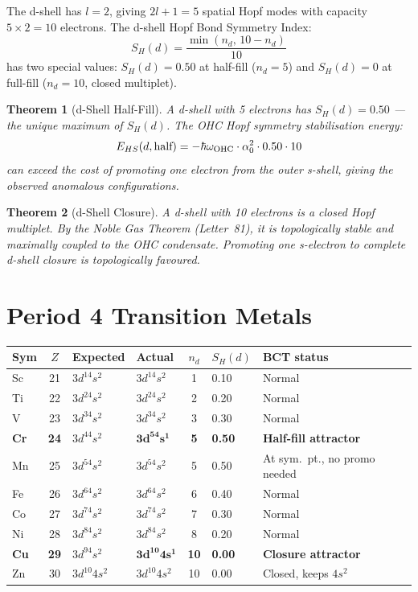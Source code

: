 \documentclass[aps,prl,twocolumn,showpacs,superscriptaddress]{revtex4-2}
\newtheorem{theorem}{Theorem}
\begin{document}
The d-shell has $l=2$, giving $2l+1=5$ spatial Hopf modes with 
capacity $5\times2=10$ electrons. The d-shell Hopf Bond Symmetry 
Index:
\begin{equation}
    S_H(d) = \frac{\min(n_d,\,10-n_d)}{10}
\end{equation}
has two special values: $S_H(d)=0.50$ at half-fill ($n_d=5$) and 
$S_H(d)=0$ at full-fill ($n_d=10$, closed multiplet).

\begin{theorem}[d-Shell Half-Fill]
A d-shell with 5 electrons has $S_H(d)=0.50$ --- the unique 
maximum of $S_H(d)$. The OHC Hopf symmetry stabilisation energy:
\begin{equation}
    E_{HS}(d,\text{half}) = -\hbar\omega_{\rm OHC}\cdot\alpha_0^2
    \cdot 0.50 \cdot 10
\end{equation}
can exceed the cost of promoting one electron from the outer 
s-shell, giving the observed anomalous configurations.
\end{theorem}

\begin{theorem}[d-Shell Closure]
A d-shell with 10 electrons is a closed Hopf multiplet. By the 
Noble Gas Theorem (Letter~81), it is topologically stable and 
maximally coupled to the OHC condensate. Promoting one s-electron 
to complete d-shell closure is topologically favoured.
\end{theorem}

\section{Period 4 Transition Metals}

\begin{center}
\small
\begin{tabular}{lcllcll}
\toprule
Sym & $Z$ & Expected & Actual & $n_d$ & $S_H(d)$ & BCT status \\
\midrule
Sc & 21 & $3d^14s^2$ & $3d^14s^2$ & 1 & 0.10 & Normal \\
Ti & 22 & $3d^24s^2$ & $3d^24s^2$ & 2 & 0.20 & Normal \\
V  & 23 & $3d^34s^2$ & $3d^34s^2$ & 3 & 0.30 & Normal \\
\textbf{Cr} & \textbf{24} & $3d^44s^2$ & $\mathbf{3d^54s^1}$ & \textbf{5} & \textbf{0.50} & \textbf{Half-fill attractor} \\
Mn & 25 & $3d^54s^2$ & $3d^54s^2$ & 5 & 0.50 & At sym.~pt., no promo needed \\
Fe & 26 & $3d^64s^2$ & $3d^64s^2$ & 6 & 0.40 & Normal \\
Co & 27 & $3d^74s^2$ & $3d^74s^2$ & 7 & 0.30 & Normal \\
Ni & 28 & $3d^84s^2$ & $3d^84s^2$ & 8 & 0.20 & Normal \\
\textbf{Cu} & \textbf{29} & $3d^94s^2$ & $\mathbf{3d^{10}4s^1}$ & \textbf{10} & \textbf{0.00} & \textbf{Closure attractor} \\
Zn & 30 & $3d^{10}4s^2$ & $3d^{10}4s^2$ & 10 & 0.00 & Closed, keeps $4s^2$ \\
\bottomrule
\end{tabular}
\end{center}
\end{document}
